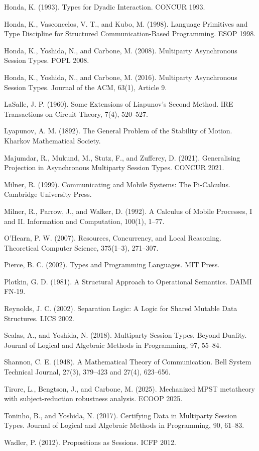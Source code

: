 \documentclass[a4paper,10pt,twocolumn,english]{article}
\numberwithin{equation}{section}
\theoremstyle{paperdef}
\theoremstyle{paperplain}
\theoremstyle{paperdef}
\theoremstyle{paperremark}
\newenvironment{citelist}{%
  \begin{list}{}{%
    \setlength{\leftmargin}{1.25em}%
    \setlength{\itemindent}{-1.25em}%
    \setlength{\itemsep}{2pt}%
    \setlength{\parsep}{0pt}%
    \setlength{\topsep}{3pt}}%
}{\end{list}}
\begin{document}
\begin{citelist}
	\item Honda, K. (1993). Types for Dyadic Interaction. CONCUR 1993.
	\item Honda, K., Vasconcelos, V. T., and Kubo, M. (1998). Language Primitives and Type Discipline for Structured Communication-Based Programming. ESOP 1998.
	\item Honda, K., Yoshida, N., and Carbone, M. (2008). Multiparty Asynchronous Session Types. POPL 2008.
	\item Honda, K., Yoshida, N., and Carbone, M. (2016). Multiparty Asynchronous Session Types. Journal of the ACM, 63(1), Article 9.
	\item LaSalle, J. P. (1960). Some Extensions of Liapunov's Second Method. IRE Transactions on Circuit Theory, 7(4), 520--527.
	\item Lyapunov, A. M. (1892). The General Problem of the Stability of Motion. Kharkov Mathematical Society.
	\item Majumdar, R., Mukund, M., Stutz, F., and Zufferey, D. (2021). Generalising Projection in Asynchronous Multiparty Session Types. CONCUR 2021.
	\item Milner, R. (1999). Communicating and Mobile Systems: The Pi-Calculus. Cambridge University Press.
	\item Milner, R., Parrow, J., and Walker, D. (1992). A Calculus of Mobile Processes, I and II. Information and Computation, 100(1), 1--77.
	\item O'Hearn, P. W. (2007). Resources, Concurrency, and Local Reasoning. Theoretical Computer Science, 375(1--3), 271--307.
	\item Pierce, B. C. (2002). Types and Programming Languages. MIT Press.
	\item Plotkin, G. D. (1981). A Structural Approach to Operational Semantics. DAIMI FN-19.
	\item Reynolds, J. C. (2002). Separation Logic: A Logic for Shared Mutable Data Structures. LICS 2002.
	\item Scalas, A., and Yoshida, N. (2018). Multiparty Session Types, Beyond Duality. Journal of Logical and Algebraic Methods in Programming, 97, 55--84.
	\item Shannon, C. E. (1948). A Mathematical Theory of Communication. Bell System Technical Journal, 27(3), 379--423 and 27(4), 623--656.
	\item Tirore, L., Bengtson, J., and Carbone, M. (2025). Mechanized MPST metatheory with subject-reduction robustness analysis. ECOOP 2025.
	\item Toninho, B., and Yoshida, N. (2017). Certifying Data in Multiparty Session Types. Journal of Logical and Algebraic Methods in Programming, 90, 61--83.
	\item Wadler, P. (2012). Propositions as Sessions. ICFP 2012.
\end{citelist}
\end{document}
